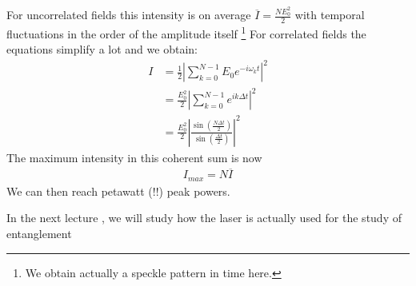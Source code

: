 \documentclass[10pt]{article}
\let\cite\citep
\providecommand\citep{\cite}
\begin{document}
For uncorrelated fields this intensity is on average $\overline{I} = \frac{NE_0^2}{2}$ with temporal fluctuations in the order of the amplitude itself \footnote{We obtain actually a speckle pattern in time here.}
For correlated fields the equations simplify a lot and we obtain:
\begin{align}
I &= \frac{1}{2}\left|\sum_{k=0}^{N-1}E_0e^{-i\omega_k t}\right|^2\\
 &= \frac{E_0^2}{2}\left|\sum_{k=0}^{N-1}e^{i k\Delta  t}\right|^2\\
 &= \frac{E_0^2}{2}\left|\frac{\sin(\frac{N\Delta t}{2})}{\sin(\frac{\Delta t}{2})}\right|^2
\end{align}
The maximum intensity in this coherent sum is now
\begin{align}
I_{max} = N\overline{I}
\end{align}
We can then reach petawatt (!!) peak powers. 

In the next lecture \cite{entanglement}, we will study how the laser is actually used for the study of entanglement

\FloatBarrier


\end{document}
